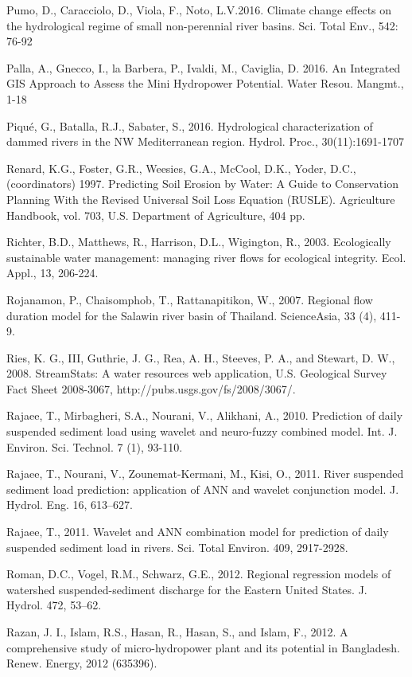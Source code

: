 \begin{hangingpar}{2em}
Pumo, D., Caracciolo, D., Viola, F., Noto, L.V.2016. Climate change effects on the hydrological regime of small non-perennial river basins. Sci. Total Env., 	542: 76-92

Palla, A., Gnecco, I., la Barbera, P., Ivaldi, M., Caviglia, D.	 2016. An Integrated GIS Approach to Assess the Mini Hydropower Potential. Water Resou. Mangmt.,	1-18

Piqué, G., Batalla, R.J., Sabater, S., 2016. Hydrological characterization of dammed rivers in the NW Mediterranean region. Hydrol. Proc., 30(11):1691-1707

Renard, K.G., Foster, G.R., Weesies, G.A., McCool, D.K., Yoder, D.C., (coordinators) 1997. Predicting Soil Erosion by Water: A Guide to Conservation Planning With the Revised Universal Soil Loss Equation (RUSLE). Agriculture Handbook, vol. 703, U.S. Department of Agriculture, 404 pp.

Richter, B.D., Matthews, R., Harrison, D.L., Wigington, R., 2003. Ecologically sustainable water management: managing river flows for ecological integrity. Ecol. Appl., 13,  206-224.

Rojanamon, P., Chaisomphob, T., Rattanapitikon, W., 2007.  Regional flow duration model for the Salawin river basin of Thailand. ScienceAsia, 33 (4), 411-9. 

Ries, K. G., III, Guthrie, J. G., Rea, A. H., Steeves, P. A., and Stewart, D. W., 2008. StreamStats: A water resources web application, U.S. Geological Survey Fact Sheet 2008-3067, http://pubs.usgs.gov/fs/2008/3067/.

Rajaee, T., Mirbagheri, S.A., Nourani, V., Alikhani, A., 2010. Prediction of daily suspended sediment load using wavelet and neuro-fuzzy combined model. Int. J. Environ. Sci. Technol. 7 (1), 93-110. 

Rajaee, T., Nourani, V., Zounemat-Kermani, M., Kisi, O., 2011. River suspended sediment load prediction: application of ANN and wavelet conjunction model. J. Hydrol. Eng. 16, 613–627.  

Rajaee, T., 2011. Wavelet and ANN combination model for prediction of daily suspended sediment load in rivers. Sci. Total Environ. 409, 2917-2928. 

Roman, D.C., Vogel, R.M., Schwarz, G.E., 2012. Regional regression models of watershed suspended-sediment discharge for the Eastern United States. J. Hydrol. 472, 53–62.

Razan, J. I., Islam, R.S., Hasan, R., Hasan, S., and Islam, F., 2012. A comprehensive study of micro-hydropower plant and its potential in Bangladesh. Renew. Energy, 2012 (635396). 


\end{hangingpar}
